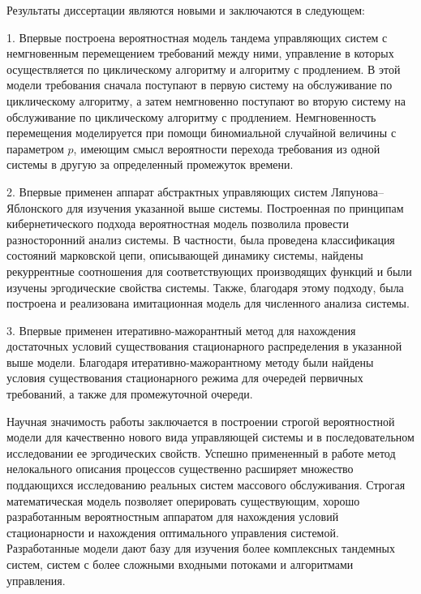 


{\novelty}Результаты диссертации являются новыми и заключаются в следующем:

1. Впервые построена вероятностная модель тандема управляющих систем с немгновенным перемещением требований между ними, управление в которых осуществляется по циклическому алгоритму и алгоритму с продлением. В этой модели требования сначала поступают в первую систему на обслуживание по циклическому алгоритму, а затем немгновенно поступают во вторую систему на обслуживание по циклическому алгоритму с продлением. Немгновенность перемещения моделируется при помощи биномиальной случайной величины с параметром $p$, имеющим смысл вероятности перехода требования из одной системы в другую за определенный промежуток времени.

2. Впервые применен аппарат абстрактных управляющих систем Ляпунова--Яблонского для изучения указанной выше системы. Построенная по принципам кибернетического подхода вероятностная модель позволила провести разносторонний анализ системы. В частности, была проведена классификация состояний марковской цепи, описывающей динамику системы, найдены рекуррентные соотношения для соответствующих производящих функций и были изучены эргодические свойства системы. Также, благодаря этому подходу, была построена и реализована имитационная модель для численного анализа системы.

3. Впервые применен итеративно-мажорантный метод для нахождения достаточных условий существования стационарного распределения в указанной выше модели. Благодаря итеративно-мажорантному методу были найдены условия существования стационарного режима для очередей первичных требований, а также для промежуточной очереди.

{\influence} Научная значимость работы заключается в построении строгой вероятностной модели 
для качественно нового вида управляющей системы и в последовательном исследовании ее эргодических свойств. Успешно примененный в работе метод нелокального описания процессов существенно расширяет множество поддающихся исследованию реальных систем массового обслуживания. Строгая математическая модель позволяет оперировать существующим, хорошо разработанным вероятностным аппаратом для нахождения условий стационарности и нахождения оптимального управления системой. 
 Разработанные модели дают базу для изучения более комплексных тандемных систем, систем с более сложными входными потоками и алгоритмами управления.

